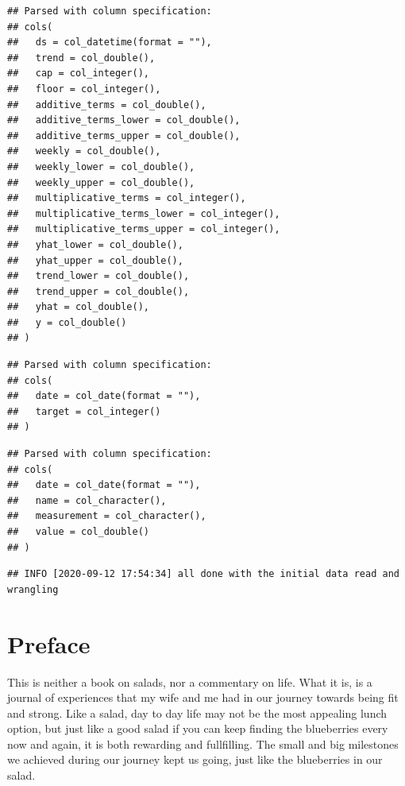 \documentclass[oneside]{book}
\begin{document}
\begin{verbatim}
## Parsed with column specification:
## cols(
##   ds = col_datetime(format = ""),
##   trend = col_double(),
##   cap = col_integer(),
##   floor = col_integer(),
##   additive_terms = col_double(),
##   additive_terms_lower = col_double(),
##   additive_terms_upper = col_double(),
##   weekly = col_double(),
##   weekly_lower = col_double(),
##   weekly_upper = col_double(),
##   multiplicative_terms = col_integer(),
##   multiplicative_terms_lower = col_integer(),
##   multiplicative_terms_upper = col_integer(),
##   yhat_lower = col_double(),
##   yhat_upper = col_double(),
##   trend_lower = col_double(),
##   trend_upper = col_double(),
##   yhat = col_double(),
##   y = col_double()
## )
\end{verbatim}

\begin{verbatim}
## Parsed with column specification:
## cols(
##   date = col_date(format = ""),
##   target = col_integer()
## )
\end{verbatim}

\begin{verbatim}
## Parsed with column specification:
## cols(
##   date = col_date(format = ""),
##   name = col_character(),
##   measurement = col_character(),
##   value = col_double()
## )
\end{verbatim}

\begin{verbatim}
## INFO [2020-09-12 17:54:34] all done with the initial data read and wrangling
\end{verbatim}

\chapter{Preface}\label{preface}

This is neither a book on salads, nor a commentary on life. What it is,
is a journal of experiences that my wife and me had in our journey
towards being fit and strong. Like a salad, day to day life may not be
the most appealing lunch option, but just like a good salad if you can
keep finding the blueberries every now and again, it is both rewarding
and fullfilling. The small and big milestones we achieved during our
journey kept us going, just like the blueberries in our salad.
\end{document}

